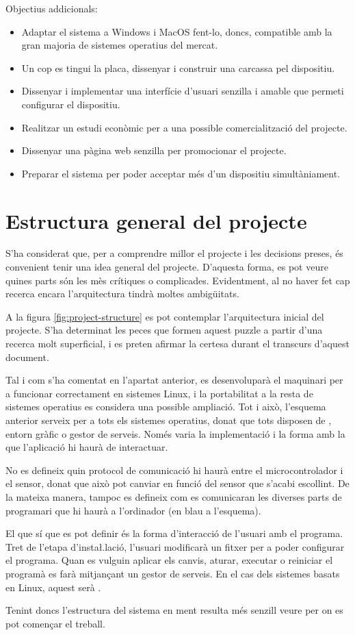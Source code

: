 Objectius addicionals:
\begin{itemize}
    \item Adaptar el sistema a Windows i MacOS fent-lo, doncs, compatible amb la
    gran majoria de sistemes operatius del mercat.
    \item Un cop es tingui la placa, dissenyar i construir una carcassa pel
    dispositiu.
    \item Dissenyar i implementar una interfície d'usuari senzilla i amable
    que permeti configurar el dispositiu.
    \item Realitzar un estudi econòmic per a una possible comercialització del
    projecte.
    \item Dissenyar una pàgina web senzilla per promocionar el projecte.
    \item Preparar el sistema per poder acceptar més d'un dispositiu
    simultàniament.
\end{itemize}

\section{Estructura general del projecte}

S'ha considerat que, per a comprendre millor el projecte i les decisions preses,
és convenient tenir una idea general del projecte. D'aquesta forma, es pot veure
quines parts són les mès crítiques o complicades. Evidentment, al no haver fet
cap recerca encara l'arquitectura tindrà moltes ambigüitats.

A la figura \ref{fig:project-structure} es pot contemplar l'arquitectura inicial
del projecte. S'ha determinat les peces que formen aquest puzzle a partir d'una
recerca molt superficial, i es preten afirmar la certesa durant el transcurs
d'aquest document.



Tal i com s'ha comentat en l'apartat anterior, es desenvoluparà el maquinari per
a funcionar correctament en sistemes Linux, i la portabilitat a la resta de
sistemes operatius es considera una possible ampliació. Tot i això, l'esquema
anterior serveix per a tots els sistemes operatius, donat que tots disposen de
, entorn gràfic o gestor de serveis. Només varia la implementació i
la forma amb la que l'aplicació hi haurà de interactuar.

No es defineix quin protocol de comunicació hi haurà entre el microcontrolador
i el sensor, donat que això pot canviar en funció del sensor que s'acabi
escollint. De la mateixa manera, tampoc es defineix com es comunicaran les
diverses parts de programari que hi haurà a l'ordinador (en blau a l'esquema).

El que sí que es pot definir és la forma d'interacció de l'usuari amb el
programa. Tret de l'etapa d'insta\l.lació, l'usuari modificarà un fitxer per a
poder configurar el programa. Quan es vulguin aplicar els canvis, aturar,
executar o reiniciar el programà es farà mitjançant un gestor de serveis. En el
cas dels sistemes basats en Linux, aquest serà .

Tenint doncs l'estructura del sistema en ment resulta més senzill veure per on
es pot començar el treball.
